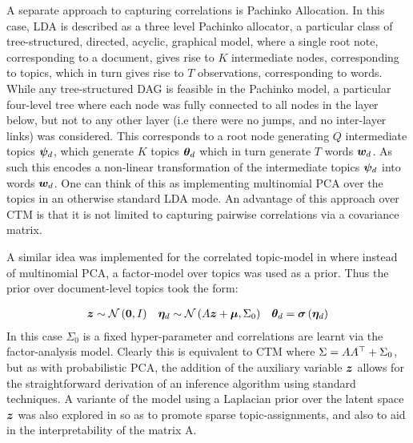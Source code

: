 A separate approach to capturing correlations is Pachinko Allocation\cite{Li2006}. In this case, LDA is described as a three level Pachinko allocator, a particular class of tree-structured, directed, acyclic, graphical model, where a single root note, corresponding to a document, gives rise to $K$ intermediate nodes, corresponding to topics, which in turn gives rise to $T$ observations, corresponding to words. While any tree-structured DAG is feasible in the Pachinko model, a particular four-level tree where each node was fully connected to all nodes in the layer below, but not to any other layer (i.e there were no jumps, and no inter-layer links) was considered. This corresponds to a root node generating $Q$ intermediate topics $\bm \psi_d$, which generate $K$ topics ${ \bm \theta_d }$ which in turn generate $T$ words ${ \bm w_d }$. As such this encodes a non-linear transformation of the intermediate topics $\bm \psi_d$ into words ${ \bm w_d }$. One can think of this as implementing multinomial PCA over the topics in an otherwise standard LDA mode. An advantage of this approach over CTM is that it is not limited to capturing pairwise correlations via a covariance matrix.

A similar idea was implemented for the correlated topic-model in \cite{Putthividhya2009} where instead of multinomial PCA, a factor-model over topics was used as a prior. Thus the prior over document-level topics took the form:

\begin{align}
\bm z & \sim \mathcal{N} \left( {\bm 0}, {I} \right) & \bm \eta_d & \sim \mathcal{N} \left( {A\bm z + \bm \mu}, {\Sigma_0} \right) & { \bm \theta_d } = \bm \sigma\left(\bm \eta_d\right) 
\end{align}
In this case $\Sigma_0$ is a fixed hyper-parameter and correlations are learnt via the factor-analysis model. Clearly this is equivalent to CTM where $\Sigma = AA^\top + \Sigma_0$, but as with probabilistic PCA, the addition of the auxiliary variable $\bm z$ allows for the straightforward derivation of an inference algorithm using standard techniques. A variante of the model using a Laplacian prior over the latent space $\bm z$ was also explored in \cite{Putthividhya2009} so as to promote sparse topic-assignments, and also to aid in the interpretability of the matrix A.



